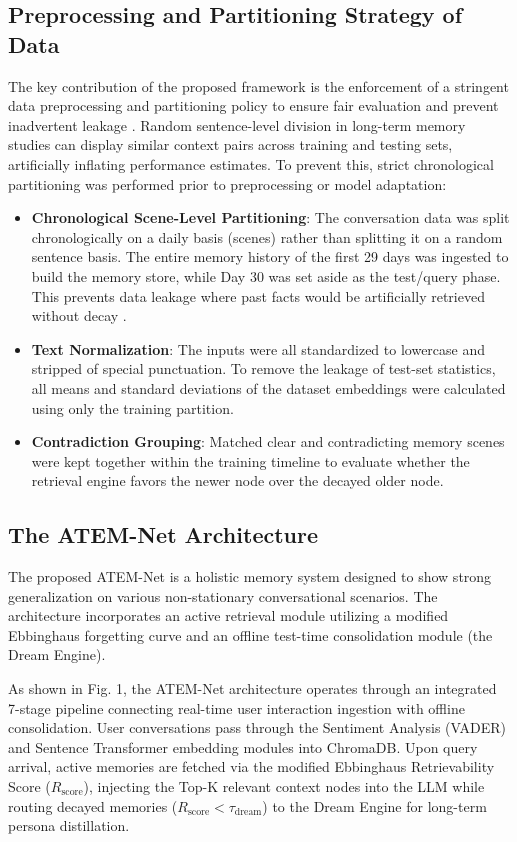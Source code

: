 \documentclass[conference]{IEEEtran}
\begin{document}
\subsection{Preprocessing and Partitioning Strategy of Data}
The key contribution of the proposed framework is the enforcement of a stringent data preprocessing and partitioning policy to ensure fair evaluation and prevent inadvertent leakage \cite{ali}. Random sentence-level division in long-term memory studies can display similar context pairs across training and testing sets, artificially inflating performance estimates. To prevent this, strict chronological partitioning was performed prior to preprocessing or model adaptation:
\begin{itemize}
    \item \textbf{Chronological Scene-Level Partitioning}: The conversation data was split chronologically on a daily basis (scenes) rather than splitting it on a random sentence basis. The entire memory history of the first 29 days was ingested to build the memory store, while Day 30 was set aside as the test/query phase. This prevents data leakage where past facts would be artificially retrieved without decay \cite{liang}.
    \item \textbf{Text Normalization}: The inputs were all standardized to lowercase and stripped of special punctuation. To remove the leakage of test-set statistics, all means and standard deviations of the dataset embeddings were calculated using only the training partition.
    \item \textbf{Contradiction Grouping}: Matched clear and contradicting memory scenes were kept together within the training timeline to evaluate whether the retrieval engine favors the newer node over the decayed older node.
\end{itemize}

\subsection{The ATEM-Net Architecture}
The proposed ATEM-Net is a holistic memory system designed to show strong generalization on various non-stationary conversational scenarios. The architecture incorporates an active retrieval module utilizing a modified Ebbinghaus forgetting curve and an offline test-time consolidation module (the Dream Engine).

As shown in Fig. 1, the ATEM-Net architecture operates through an integrated 7-stage pipeline connecting real-time user interaction ingestion with offline consolidation. User conversations pass through the Sentiment Analysis (VADER) and Sentence Transformer embedding modules into ChromaDB. Upon query arrival, active memories are fetched via the modified Ebbinghaus Retrievability Score ($R_{\text{score}}$), injecting the Top-K relevant context nodes into the LLM while routing decayed memories ($R_{\text{score}} < \tau_{\text{dream}}$) to the Dream Engine for long-term persona distillation.
\end{document}

